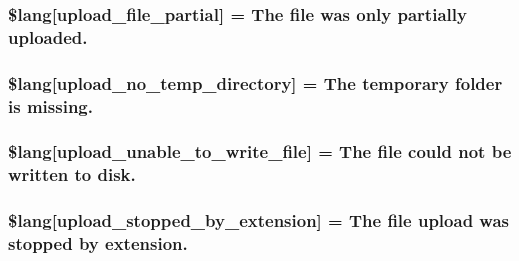 \subsubsection[{\$lang}]{\setlength{\rightskip}{0pt plus 5cm}\$lang\mbox{[}\textquotesingle{}upload\+\_\+file\+\_\+partial\textquotesingle{}\mbox{]} = \textquotesingle{}The file was only partially uploaded.\textquotesingle{}}\label{system_2language_2english_2upload__lang_8php_a79751b02ce35007a90bd9052f83deed9}
\hypertarget{system_2language_2english_2upload__lang_8php_ac7144f4992346816875bac28488ef715}{}
\subsubsection[{\$lang}]{\setlength{\rightskip}{0pt plus 5cm}\$lang\mbox{[}\textquotesingle{}upload\+\_\+no\+\_\+temp\+\_\+directory\textquotesingle{}\mbox{]} = \textquotesingle{}The temporary folder is missing.\textquotesingle{}}\label{system_2language_2english_2upload__lang_8php_ac7144f4992346816875bac28488ef715}
\hypertarget{system_2language_2english_2upload__lang_8php_a620b622468d4e7781fed6316440c85e7}{}
\subsubsection[{\$lang}]{\setlength{\rightskip}{0pt plus 5cm}\$lang\mbox{[}\textquotesingle{}upload\+\_\+unable\+\_\+to\+\_\+write\+\_\+file\textquotesingle{}\mbox{]} = \textquotesingle{}The file could not be written to disk.\textquotesingle{}}\label{system_2language_2english_2upload__lang_8php_a620b622468d4e7781fed6316440c85e7}
\hypertarget{system_2language_2english_2upload__lang_8php_ae97257deea3dddb33be4bbc6510a464b}{}
\subsubsection[{\$lang}]{\setlength{\rightskip}{0pt plus 5cm}\$lang\mbox{[}\textquotesingle{}upload\+\_\+stopped\+\_\+by\+\_\+extension\textquotesingle{}\mbox{]} = \textquotesingle{}The file upload was stopped by extension.\textquotesingle{}}\label{system_2language_2english_2upload__lang_8php_ae97257deea3dddb33be4bbc6510a464b}
\hypertarget{system_2language_2english_2upload__lang_8php_a88d8e8f9b879d1c25e6c089f3d3b5a30}{}

